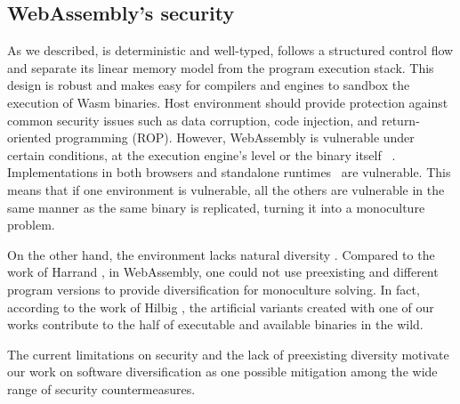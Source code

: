 




\subsection*{WebAssembly's security}

As we described, \wasm is deterministic and well-typed, follows a structured control flow and separate its linear memory model from the program execution stack. This design is robust \cite{WebAssemblySecurity} and makes easy for compilers and engines to sandbox the execution of Wasm binaries.
Host environment should provide protection against common security issues such as data corruption, code injection, and return-oriented programming (ROP). However, WebAssembly is vulnerable under certain conditions, at the execution engine's level \cite{ChromeZero} or the binary itself ~\cite{usenixWasm2020}.
Implementations in both browsers and standalone runtimes~\cite{Narayan2021Swivel} are vulnerable.
This means that if one environment is vulnerable, all the others are vulnerable in the same manner as the same \wasm binary is replicated, turning it into a monoculture problem.


On the other hand, the \wasm environment lacks natural diversity \cite{natural_diversity}. Compared to the work of Harrand \etal \citationneeded, in WebAssembly, one could not use preexisting and different program versions to provide diversification for monoculture solving. In fact, according to the work of Hilbig \etal \cite{Hilbig2021AnES}, the artificial variants created with one of our works contribute to the half of executable and available \wasm binaries in the wild. 


The current limitations on security and the lack of preexisting diversity motivate our work on software diversification as one possible mitigation among the wide range of security countermeasures. 

